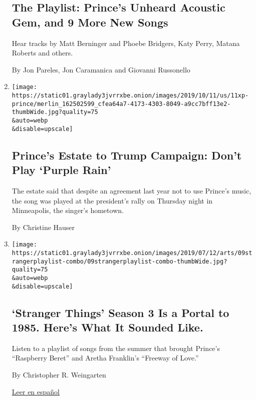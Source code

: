 \begin{enumerate}
  \hypertarget{the-playlist-princes-unheard-acoustic-gem-and-9-more-new-songs}{%
  \subsection{The Playlist: Prince's Unheard Acoustic Gem, and 9 More
  New
  Songs}\label{the-playlist-princes-unheard-acoustic-gem-and-9-more-new-songs}}

  Hear tracks by Matt Berninger and Phoebe Bridgers, Katy Perry, Matana
  Roberts and others.

  By Jon Pareles, Jon Caramanica and Giovanni Russonello
\item
  \href{/2019/10/11/us/prince-trump-rally-purple-rain.html}{}

  \texttt{[image: https://static01.graylady3jvrrxbe.onion/images/2019/10/11/us/11xp-prince/merlin\_162502599\_cfea64a7-4173-4303-8049-a9cc7bff13e2-thumbWide.jpg?quality=75\\\&auto=webp\\\&disable=upscale]}

  \hypertarget{princes-estate-to-trump-campaign-dont-play-purple-rain}{%
  \subsection{Prince's Estate to Trump Campaign: Don't Play `Purple
  Rain'}\label{princes-estate-to-trump-campaign-dont-play-purple-rain}}

  The estate said that despite an agreement last year not to use
  Prince's music, the song was played at the president's rally on
  Thursday night in Minneapolis, the singer's hometown.

  By Christine Hauser
\item
  \href{/2019/07/09/arts/music/stranger-things-1985-playlist.html}{}

  \texttt{[image: https://static01.graylady3jvrrxbe.onion/images/2019/07/12/arts/09strangerplaylist-combo/09strangerplaylist-combo-thumbWide.jpg?quality=75\\\&auto=webp\\\&disable=upscale]}

  \hypertarget{stranger-things-season-3-is-a-portal-to-1985-heres-what-it-sounded-like}{%
  \subsection{`Stranger Things' Season 3 Is a Portal to 1985. Here's
  What It Sounded
  Like.}\label{stranger-things-season-3-is-a-portal-to-1985-heres-what-it-sounded-like}}

  Listen to a playlist of songs from the summer that brought Prince's
  ``Raspberry Beret'' and Aretha Franklin's ``Freeway of Love.''

  By Christopher R. Weingarten

  \href{https://www.nytimes3xbfgragh.onion/es/2019/07/20/stranger-things-3-musica}{Leer
  en español}
\end{enumerate}

